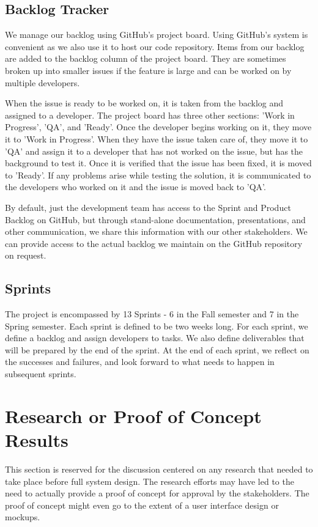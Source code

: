 \subsection{Backlog Tracker}
We manage our backlog using GitHub's project board. Using GitHub's system is 
convenient as we also use it to host our code repository. Items from our backlog 
are added to the backlog column of the project board. They are sometimes broken 
up into smaller issues if the feature is large and can be worked on by multiple 
developers.

When the issue is ready to be worked on, it is taken from the backlog and 
assigned to a developer. The project board has three other sections: 
'Work in Progress', 'QA', and 'Ready'. Once the developer begins working on it, 
they move it to 'Work in Progress'. When they have the issue taken care of, they
move it to 'QA' and assign it to a developer that has not worked on the issue, 
but has the background to test it. Once it is verified that the issue has been 
fixed, it is moved to 'Ready'. If any problems arise while testing the solution,
it is communicated to the developers who worked on it and the issue is moved 
back to 'QA'.

By default, just the development team has access to the Sprint and Product 
Backlog on GitHub, but through stand-alone documentation, presentations, and 
other communication, we share this information with our other stakeholders. 
We can provide access to the actual backlog we maintain on the GitHub repository
on request.

\subsection{Sprints}
The project is encompassed by 13 Sprints - 6 in the Fall semester and 7 in the 
Spring semester. Each sprint is defined to be two weeks long. 
For each sprint, we define a backlog and assign developers to tasks. We also 
define deliverables that will be prepared by the end of the sprint. At the end 
of each sprint, we reflect on the successes and failures, and look forward to 
what needs to happen in subsequent sprints.


\section{Research or Proof of Concept Results}
This section is reserved for the discussion centered on any research that needed
to take place before full system design.  The research efforts may have led to
the need to actually provide a proof of concept for approval by the stakeholders.
 The proof of concept might even go to the extent of a user interface design or
mockups.


